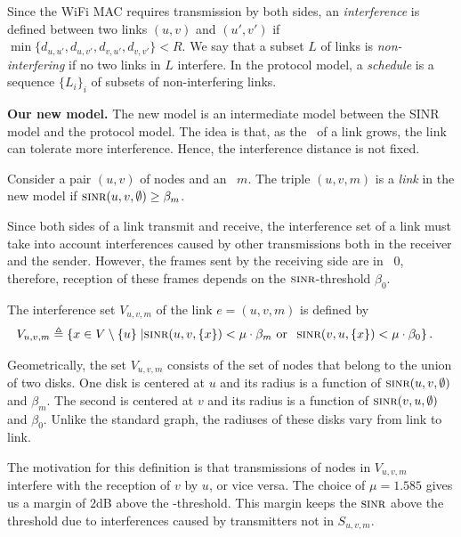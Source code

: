 \documentclass[11pt]{article}
\newenvironment{proof sketch}[1]{\noindent {\emph{Proof sketch of #1:}}}{\hfill \qed}
\newcommand{\eqdf}{\triangleq}
\newcommand{\SINR}{\text{\sc{sinr}}}
\newcommand{\SNR}{\text{\sc{snr}}}
\newcommand{\MCS}{\text{\sc{mcs}}}
\begin{document}
Since the WiFi MAC requires transmission by both sides, an
\emph{interference} is defined between two links $(u,v)$ and $(u',v')$
if $\min\{d_{u,u'},d_{u,v'}, d_{v,u'}, d_{v,v'}\} < R$.  We say that a
subset $L$ of links is \emph{non-interfering} if no two links in $L$
interfere.  In the protocol model, a \emph{schedule} is a sequence
$\{L_i\}_i$ of subsets of non-interfering links.

\medskip
\noindent
\textbf{Our new model.}  The new model is an intermediate model
between the SINR model and the protocol model. The idea is that, as
the \SNR\ of a link grows, the link can tolerate more interference.
Hence, the interference distance is not fixed.

Consider a pair $(u,v)$ of nodes and an \MCS\ $m$.  The triple
$(u,v,m)$ is a \emph{link} in the new model if $\SINR(u,v,\emptyset)
\geq \beta_m$.

Since both sides of a link transmit and receive, the interference set
of a link must take into account interferences caused by other
transmissions both in the receiver and the sender. However, the frames
sent by the receiving side are in \MCS\ $0$, therefore, reception of
these frames depends on the $\SINR$-threshold $\beta_0$.

The interference set $V_{u,v,m}$ of the link $e=(u,v,m)$ is defined by
\begin{align*}
  V_{u,v,m} \eqdf \left\{ x \in V \setminus\{u\}\right. &\left |
    \SINR(u,v,\{x\}) < \mu \cdot \beta_m \text{ or } \right.
  \left.\SINR(v,u,\{x\}) < \mu \cdot \beta_0\right\}.
\end{align*}

Geometrically, the set $V_{u,v,m}$ consists of the set of nodes that
belong to the union of two disks. One disk is centered at $u$ and its
radius is a function of $\SINR(u,v,\emptyset)$ and $\beta_m$. The
second is centered at $v$ and its radius is a function of
$\SINR(v,u,\emptyset)$ and $\beta_0$. Unlike the standard graph, the
radiuses of these disks vary from link to link.

The motivation for this definition is that transmissions of nodes in
$V_{u,v,m}$ interfere with the reception of $v$ by $u$, or vice versa.
The choice of $\mu=1.585$ gives us a margin of $2$dB above the
\SINR-threshold.  This margin keeps the $\SINR$ above the threshold
due to interferences caused by transmitters not in $S_{u,v,m}$.
\end{document}
